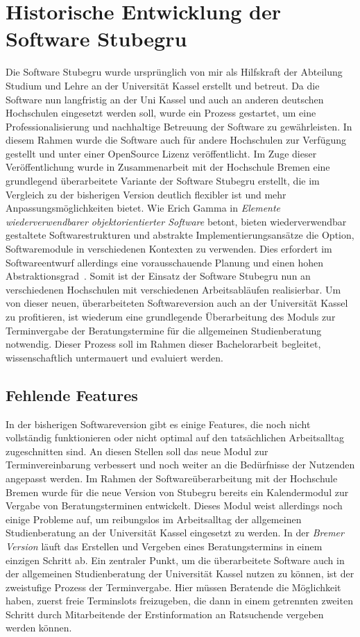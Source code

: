 \section{Historische Entwicklung der Software Stubegru}
Die Software Stubegru wurde ursprünglich von mir als Hilfskraft der Abteilung
Studium und Lehre an der Universität Kassel erstellt und betreut. Da die
Software nun langfristig an der Uni Kassel und auch an anderen deutschen
Hochschulen eingesetzt werden soll, wurde ein Prozess gestartet, um eine
Professionalisierung und nachhaltige Betreuung der Software zu gewährleisten.
In diesem Rahmen wurde die Software auch für andere Hochschulen zur Verfügung
gestellt und unter einer OpenSource Lizenz veröffentlicht. Im Zuge dieser
Veröffentlichung wurde in Zusammenarbeit mit der Hochschule Bremen eine
grundlegend überarbeitete Variante der Software Stubegru erstellt, die im
Vergleich zu der bisherigen Version deutlich flexibler ist und mehr
Anpassungsmöglichkeiten bietet. Wie Erich Gamma in \textit{Elemente
    wiederverwendbarer objektorientierter Software} betont, bieten wiederverwendbar
gestaltete Softwarestrukturen und abstrakte Implementierungsansätze die Option,
Softwaremodule in verschiedenen Kontexten zu verwenden. Dies erfordert im
Softwareentwurf allerdings eine vorausschauende Planung und einen hohen
Abstraktionsgrad~\cite{wiederverwSoftware}. Somit ist der Einsatz der Software
Stubegru nun an verschiedenen Hochschulen mit verschiedenen Arbeitsabläufen
realisierbar. Um von dieser neuen, überarbeiteten Softwareversion auch an der
Universität Kassel zu profitieren, ist wiederum eine grundlegende
Überarbeitung des Moduls zur Terminvergabe der Beratungstermine für die
allgemeinen Studienberatung notwendig. Dieser Prozess soll im Rahmen dieser
Bachelorarbeit begleitet, wissenschaftlich untermauert und evaluiert werden.

\subsection*{Fehlende Features}
In der bisherigen Softwareversion gibt es einige Features, die noch nicht
vollständig funktionieren oder nicht optimal auf den tatsächlichen
Arbeitsalltag zugeschnitten sind. An diesen Stellen soll das neue Modul zur
Terminvereinbarung verbessert und noch weiter an die Bedürfnisse der Nutzenden
angepasst werden. Im Rahmen der Softwareüberarbeitung mit der Hochschule Bremen
wurde für die neue Version von Stubegru bereits ein Kalendermodul zur Vergabe
von Beratungsterminen entwickelt. Dieses Modul weist allerdings noch einige
Probleme auf, um reibungslos im Arbeitsalltag der allgemeinen Studienberatung
an der Universität Kassel eingesetzt zu werden. In der \textit{Bremer Version} läuft
das Erstellen und Vergeben eines Beratungstermins in einem einzigen Schritt ab.
Ein zentraler Punkt, um die überarbeitete Software auch in der allgemeinen
Studienberatung der Universität Kassel nutzen zu können, ist der zweistufige
Prozess der Terminvergabe. Hier müssen Beratende die Möglichkeit haben, zuerst
freie Terminslots freizugeben, die dann in einem getrennten zweiten Schritt
durch Mitarbeitende der Erstinformation an Ratsuchende vergeben werden können.

